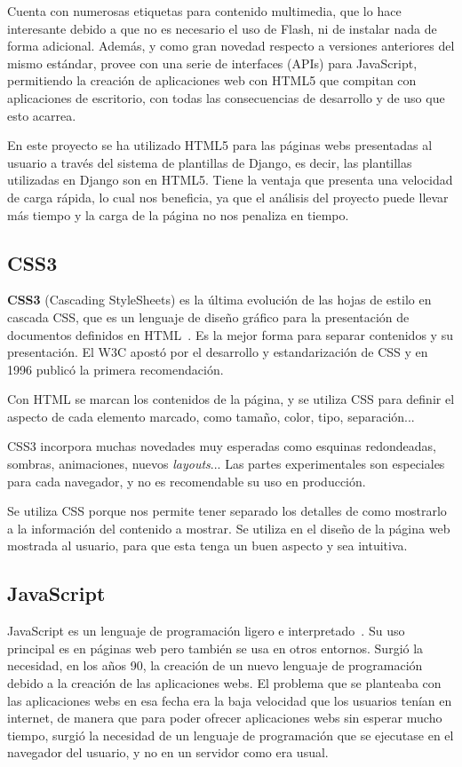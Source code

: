 \documentclass[a4paper, 12pt]{book}
\begin{document}
Cuenta con numerosas etiquetas para contenido multimedia, que lo hace interesante debido a
que no es necesario el uso de Flash, ni de instalar nada de forma adicional. Además, y como gran novedad respecto a versiones anteriores del mismo estándar, provee con una serie de interfaces (APIs) para JavaScript, permitiendo la creación de aplicaciones web con HTML5 que compitan con aplicaciones de escritorio, con todas las consecuencias de desarrollo y de uso que esto acarrea.

En este proyecto se ha utilizado HTML5 para las páginas webs presentadas al usuario a través del sistema de plantillas de Django, es decir, las plantillas utilizadas en Django son en HTML5. Tiene la ventaja que presenta una velocidad de carga rápida, lo cual nos beneficia, ya que el análisis del proyecto puede llevar más tiempo y la carga de la página no nos penaliza en tiempo.

\subsection{CSS3}
\label{subsec:CSS3}

\textbf{CSS3} (Cascading StyleSheets) es la última evolución de las hojas de estilo en cascada CSS, que es un lenguaje de diseño gráfico para la presentación de documentos
definidos en HTML~\cite{mcfarland2012css3,gauchat2012gran}. Es la mejor forma para separar contenidos y su presentación.
El W3C apostó por el desarrollo y estandarización de CSS y en 1996 publicó la primera recomendación.

Con HTML se marcan los contenidos de la página, y se utiliza CSS para definir el aspecto de cada
elemento marcado, como tamaño, color, tipo, separación...

CSS3 incorpora muchas novedades muy esperadas como esquinas redondeadas, sombras, animaciones, nuevos \emph{layouts}...
Las partes experimentales son especiales para cada navegador, y no es recomendable su uso en producción.

Se utiliza CSS porque nos permite tener separado los detalles de como mostrarlo a la información del contenido a mostrar. Se utiliza en el diseño de la página web mostrada al usuario, para que esta tenga un buen aspecto y sea intuitiva.
\subsection{JavaScript}
\label{subsec:javascript}

JavaScript es un lenguaje de programación ligero e interpretado~\cite{flanagan2006javascript,gauchat2012gran}. Su uso principal es en páginas web pero también se usa en otros entornos.
Surgió la necesidad, en los años 90, la creación de un nuevo lenguaje de programación debido a la creación de las aplicaciones webs. El problema que se planteaba con las aplicaciones webs en esa fecha era la baja velocidad que los usuarios tenían en internet, de manera que para poder ofrecer aplicaciones webs sin esperar mucho tiempo, surgió la necesidad de un lenguaje de programación que se ejecutase en el navegador del usuario, y no en un servidor como era usual.
\end{document}
